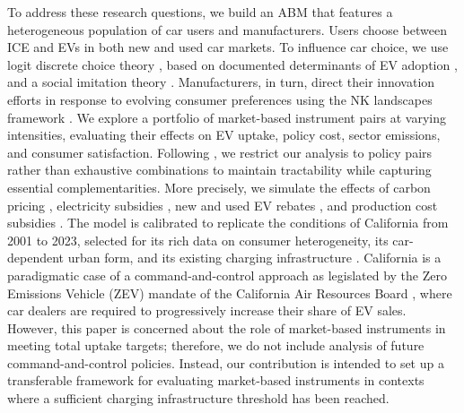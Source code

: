 \documentclass[12pt]{article}
\begin{document}
To address these research questions, we build an ABM that features a heterogeneous population of car users and manufacturers. Users choose between ICE and EVs in both new and used car markets. To influence car choice, we use logit discrete choice theory \citep{McFadden1974}, based on documented determinants of EV adoption \citep{singh_review_2020,pandita2024electrifying}, and a social imitation theory \citep{rogers2003diffusion}. Manufacturers, in turn, direct their innovation efforts in response to evolving consumer preferences \citep{windrum2009consumer} using the NK landscapes framework \citep{kauffman1993origins,levinthal1997adaptation}. We explore a portfolio of market-based instrument pairs at varying intensities, evaluating their effects on EV uptake, policy cost, sector emissions, and consumer satisfaction. Following \citet{van2021designing}, we restrict our analysis to policy pairs rather than exhaustive combinations to maintain tractability while capturing essential complementarities. More precisely, we simulate the effects of carbon pricing \citep{Hardman2019Understanding}, electricity subsidies \citep{Kwon2018Evaluation}, new and used EV rebates \citep{Lodhia2024Assessment}, and production cost subsidies \citep{OECD2025Subsidies}. The model is calibrated to replicate the conditions of California from 2001 to 2023, selected for its rich data on consumer heterogeneity, its car-dependent urban form, and its existing charging infrastructure \citep{borlaug_public_2023}. California is a paradigmatic case of a command-and-control approach as legislated by the Zero Emissions Vehicle (ZEV) mandate of the California Air Resources Board \citep{wesseling2015exploring}, where car dealers are required to progressively increase their share of EV sales. However, this paper is concerned about the role of market-based instruments in meeting total uptake targets; therefore, we do not include analysis of future command-and-control policies. Instead, our contribution is intended to set up a transferable framework for evaluating market-based instruments in contexts where a sufficient charging infrastructure threshold has been reached.  
\end{document}
